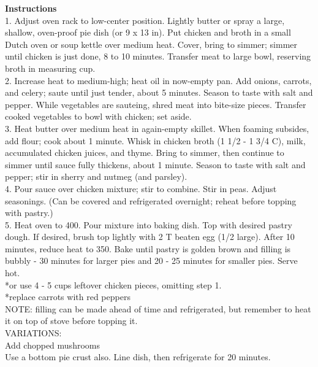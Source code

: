 \documentclass{article}
\numberwithin{figure}{section}
\numberwithin{equation}{section}
\begin{document}
{\bf Instructions}\\
1.  Adjust oven rack to low-center position.  Lightly butter or spray a large, shallow, oven-proof pie dish (or 9 x 13 in).  Put chicken and broth in a small Dutch oven or soup kettle over medium heat.  Cover, bring to simmer; simmer until chicken is just done, 8 to 10 minutes.  Transfer meat to large bowl, reserving broth in measuring cup.\\

2.  Increase heat to medium-high; heat oil in now-empty pan.  Add onions, carrots, and celery; saute until just tender, about 5 minutes.  Season to taste with salt and pepper.  While vegetables are sauteing, shred meat into bite-size pieces.  Transfer cooked vegetables to bowl with chicken; set aside.\\

3.  Heat butter over medium heat in again-empty skillet.  When foaming subsides, add flour; cook about 1 minute.  Whisk in chicken broth (1 1/2 - 1 3/4 C), milk, accumulated chicken juices, and thyme.  Bring to simmer, then continue to simmer until sauce fully thickens, about 1 minute.  Season to taste with salt and pepper; stir in sherry and nutmeg (and parsley).\\

4.  Pour sauce over chicken mixture; stir to combine.  Stir in peas.  Adjust seasonings.  (Can be covered and refrigerated overnight; reheat before topping with pastry.)\\

5.  Heat oven to 400.  Pour mixture into baking dish.  Top with desired pastry dough.  If desired, brush top lightly with 2 T beaten egg (1/2 large). After 10 minutes, reduce heat to 350.   Bake until pastry is golden brown and filling is bubbly - 30 minutes for larger pies and 20 - 25 minutes for smaller pies.  Serve hot.\\

*or use  4 - 5 cups leftover chicken pieces, omitting step 1.\\

*replace carrots with red peppers\\
NOTE:  filling can be made ahead of time and refrigerated, but remember to heat it on top of stove before topping it.\\

VARIATIONS:\\
Add chopped mushrooms\\
Use a bottom pie crust also. Line dish, then refrigerate for 20 minutes.
\end{document}
